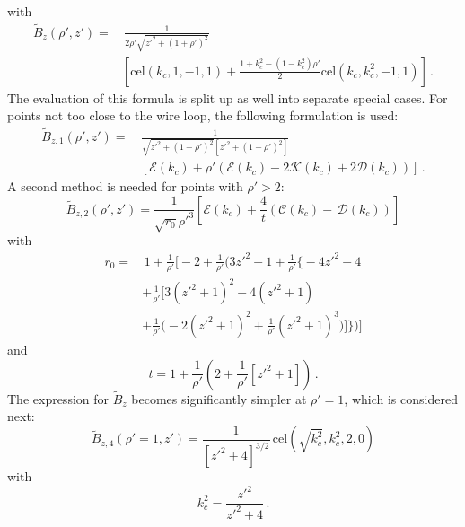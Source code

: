 with
\begin{align}
  \tilde{B}_z(\rho', z')
  =&\, \frac{1}{2 \rho' \sqrt{z'^2 + (1 + \rho')^2}} \nonumber \\
 ~& \left[
       \textrm{cel}(k_c, 1, -1, 1)
     + \frac{1 + k_c^2 - \left( 1 - k_c^2 \right) \rho'}{2} \textrm{cel}(k_c, k_c^2, -1, 1)
   \right] \, .
\end{align}
The evaluation of this formula is split up as well into separate special cases.
For points not too close to the wire loop,
the following formulation is used:
\begin{align}
  \tilde{B}_{z,1} (\rho', z')
  =&\, \frac{1}{\sqrt{{z'}^2 + (1+\rho')^2} \left[{z'}^2 + (1 - \rho')^2 \right] } \nonumber \\
  ~&\,  \left[ \mathcal{E}(k_c) + \rho' \left( \mathcal{E}(k_c) - 2 \mathcal{K}(k_c) + 2 \mathcal{D}(k_c) \right) \right] \, . \label{eqn:cwl_B_z_f1}
\end{align}
A second method is needed for points with $\rho' > 2$:
\begin{equation}
  \tilde{B}_{z,2} (\rho', z')
  = \frac{1}{\sqrt{r_0} {\rho'}^3}
    \left[ \mathcal{E}(k_c) + \frac{4}{t} \left( \mathcal{C}(k_c) - \,\mathcal{D}(k_c) \right) \right] \label{eqn:cwl_B_z_f2}
\end{equation}
with
\begin{align}
  r_0
  = &\,             1 + \frac{1}{\rho'} \Biggl[
                  - 2 + \frac{1}{\rho'} \Biggl(
         3 {z'}^2 - 1 + \frac{1}{\rho'} \Biggl\{
       - 4 {z'}^2 + 4 \nonumber \\
  ~& + \frac{1}{\rho'} \Biggl[ 3 \left( {z'}^2 + 1 \right)^2 - 4 \left( {z'}^2 + 1 \right) \nonumber \\
  ~& + \frac{1}{\rho'} \Biggl(-2 \left( {z'}^2 + 1 \right)^2 + \frac{1}{\rho'} \left( {z'}^2 + 1 \right)^3
       \Biggr)
       \Biggr]
       \Biggr\}
       \Biggr)
       \Biggr]
\end{align}
and
\begin{equation}
  t = 1 + \frac{1}{\rho'} \left( 2 + \frac{1}{\rho'} \left[ {z'}^2 + 1 \right] \right) \, .
\end{equation}
The expression for $\tilde{B}_z$ becomes significantly simpler at $\rho'=1$,
which is considered next:
\begin{equation}
  \tilde{B}_{z,4} (\rho'=1, z')
  = \frac{1}{\left[ {z'}^2 + 4 \right]^{3/2}} \,\mathrm{cel}(\sqrt{k_c^2}, k_c^2, 2, 0) \label{eqn:cwl_B_z_v}
\end{equation}
with
\begin{equation}
  k_c^2 = \frac{{z'}^2}{{z'}^2 + 4} \, .
\end{equation}
